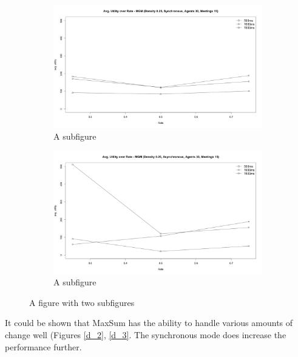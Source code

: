 \begin{figure}[H]
\centering
\begin{subfigure}{0.5\textwidth}
  \centering
  \includegraphics[width=1\linewidth]{graphics/experiments/dynamic/d_4.png}
  \caption{A subfigure}
  \label{fig:d_ç}
\end{subfigure}%
\begin{subfigure}{0.5\textwidth}
  \centering
  \includegraphics[width=1\linewidth]{graphics/experiments/dynamic/d_5.png}
  \caption{A subfigure}
  \label{fig:d_5}
\end{subfigure}
\caption{A figure with two subfigures}
\label{fig:test}
\end{figure}

It could be shown that MaxSum has the ability to handle various amounts of change well (Figures \ref{d_2}, \ref{d_3}. The synchronous mode does increase the performance further.






